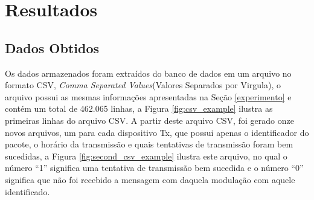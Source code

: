 \chapter{Resultados}
\label{resultados}

\section{Dados Obtidos}
Os dados armazenados foram extraídos do banco de dados em um arquivo no formato CSV, \emph{Comma Separated Values}(Valores Separados por Virgula), o arquivo possui as mesmas informações apresentadas na Seção \ref{experimento} e contém um total de 462.065 linhas, a Figura \ref{fig:csv_example} ilustra as primeiras linhas do arquivo CSV. A partir deste arquivo CSV, foi gerado onze novos arquivos, um para cada dispositivo Tx, que possui apenas o identificador do pacote, o horário da transmissão e quais tentativas de transmissão foram bem sucedidas, a Figura \ref{fig:second_csv_example} ilustra este arquivo, no qual o número ``1'' significa uma tentativa de transmissão bem sucedida e o número ``0'' significa que não foi recebido a mensagem com daquela modulação com aquele identificado.


